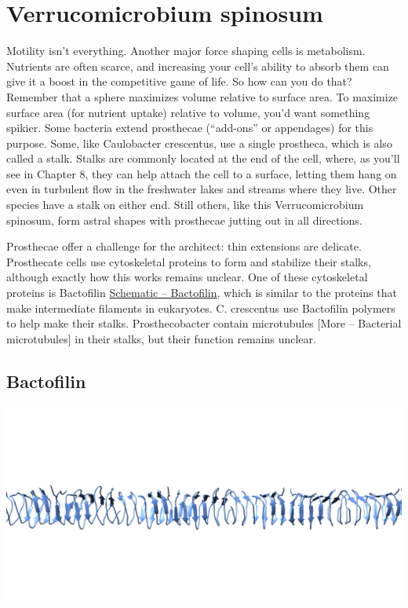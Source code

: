 \documentclass[]{tufte-book}
\begin{document}
\section{Verrucomicrobium spinosum}\label{verrucomicrobium-spinosum}

Motility isn't everything. Another major force shaping cells is
metabolism. Nutrients are often scarce, and increasing your cell's
ability to absorb them can give it a boost in the competitive game of
life. So how can you do that? Remember that a sphere maximizes volume
relative to surface area. To maximize surface area (for nutrient uptake)
relative to volume, you'd want something spikier. Some bacteria extend
prosthecae (``add-ons'' or appendages) for this purpose. Some, like
Caulobacter crescentus, use a single prostheca, which is also called a
stalk. Stalks are commonly located at the end of the cell, where, as
you'll see in Chapter 8, they can help attach the cell to a surface,
letting them hang on even in turbulent flow in the freshwater lakes and
streams where they live. Other species have a stalk on either end. Still
others, like this Verrucomicrobium spinosum, form astral shapes with
prosthecae jutting out in all directions.

Prosthecae offer a challenge for the architect: thin extensions are
delicate. Prosthecate cells use cytoskeletal proteins to form and
stabilize their stalks, although exactly how this works remains unclear.
One of these cytoskeletal proteins is Bactofilin
\protect\hyperlink{Bactofilin}{Schematic -- Bactofilin}, which is
similar to the proteins that make intermediate filaments in eukaryotes.
C. crescentus use Bactofilin polymers to help make their stalks.
Prosthecobacter contain microtubules {[}More -- Bacterial
microtubules{]} in their stalks, but their function remains unclear.

\hypertarget{Bactofilin}{\subsection{Bactofilin}\label{Bactofilin}}

\includegraphics{img/03_schematic/3_6_1_bactofilin}
\end{document}
